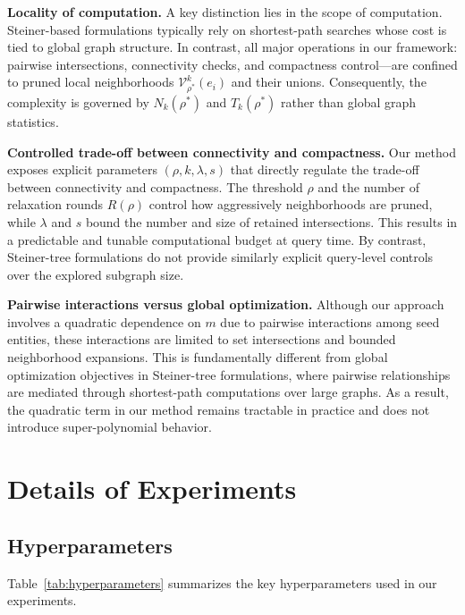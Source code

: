 \textbf{Locality of computation.}
A key distinction lies in the scope of computation.
Steiner-based formulations typically rely on shortest-path searches whose cost is tied to global graph structure.
In contrast, all major operations in our framework: pairwise intersections, connectivity checks,
and compactness control—are confined to pruned local neighborhoods
$\mathcal V^k_{\rho^*}(e_i)$ and their unions.
Consequently, the complexity is governed by $N_k(\rho^*)$ and $T_k(\rho^*)$ rather than global graph statistics.

\textbf{Controlled trade-off between connectivity and compactness.}
Our method exposes explicit parameters $(\rho,k,\lambda,s)$ that directly regulate the trade-off
between connectivity and compactness.
The threshold $\rho$ and the number of relaxation rounds $R(\rho)$ control how aggressively neighborhoods are pruned,
while $\lambda$ and $s$ bound the number and size of retained intersections.
This results in a predictable and tunable computational budget at query time.
By contrast, Steiner-tree formulations do not provide similarly explicit query-level controls over the explored subgraph size.

\textbf{Pairwise interactions versus global optimization.}
Although our approach involves a quadratic dependence on $m$ due to pairwise interactions among seed entities,
these interactions are limited to set intersections and bounded neighborhood expansions.
This is fundamentally different from global optimization objectives in Steiner-tree formulations,
where pairwise relationships are mediated through shortest-path computations over large graphs.
As a result, the quadratic term in our method remains tractable in practice and does not introduce super-polynomial behavior.



\section{Details of Experiments}

\subsection{Hyperparameters}\label{sec:hyperparameters}
Table~\ref{tab:hyperparameters} summarizes the key hyperparameters used in our experiments.

